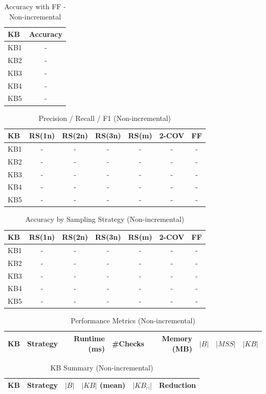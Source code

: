 \begin{table}[htbp]
\centering
\caption{Accuracy with FF - Non-incremental}
\label{tab:table11_non-incremental}
\begin{tabular}{lc}
\toprule
KB & Accuracy \\
\midrule
KB1 & - \\
KB2 & - \\
KB3 & - \\
KB4 & - \\
KB5 & - \\
\bottomrule
\end{tabular}
\end{table}

\begin{table}[htbp]
\centering
\caption{Precision / Recall / F1 (Non-incremental)}
\label{tab:fold_metrics_non-incremental}
\begin{tabular}{lcccccc}
\toprule
KB & RS(1n) & RS(2n) & RS(3n) & RS(m) & 2-COV & FF \\
\midrule
KB1 & - & - & - & - & - & - \\
KB2 & - & - & - & - & - & - \\
KB3 & - & - & - & - & - & - \\
KB4 & - & - & - & - & - & - \\
KB5 & - & - & - & - & - & - \\
\bottomrule
\end{tabular}
\end{table}

\begin{table}[htbp]
\centering
\caption{Accuracy by Sampling Strategy (Non-incremental)}
\label{tab:accuracy_non-incremental}
\begin{tabular}{lcccccc}
\toprule
KB & RS(1n) & RS(2n) & RS(3n) & RS(m) & 2-COV & FF \\
\midrule
KB1 & - & - & - & - & - & - \\
KB2 & - & - & - & - & - & - \\
KB3 & - & - & - & - & - & - \\
KB4 & - & - & - & - & - & - \\
KB5 & - & - & - & - & - & - \\
\bottomrule
\end{tabular}
\end{table}

\begin{table}[htbp]
\centering
\caption{Performance Metrics (Non-incremental)}
\label{tab:performance_non-incremental}
\begin{tabular}{llrrrrrr}
\toprule
KB & Strategy & Runtime (ms) & \#Checks & Memory (MB) & $|B|$ & $|MSS|$ & $|KB|$ \\
\midrule
\bottomrule
\end{tabular}
\end{table}

\begin{table}[htbp]
\centering
\caption{KB Summary (Non-incremental)}
\label{tab:kb_summary_non-incremental}
\begin{tabular}{llrrrr}
\toprule
KB & Strategy & $|B|$ & $|KB|$ (mean) & $|KB_{\cap}|$ & Reduction \\
\midrule
\bottomrule
\end{tabular}
\end{table}